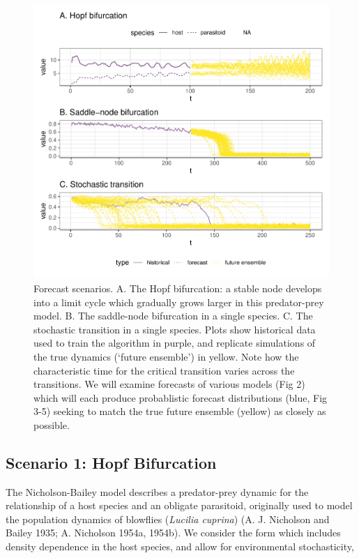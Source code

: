 \documentclass{article}
\begin{document}
\begin{figure}
\centering
\includegraphics{manuscript_files/figure-latex/figure1-1.pdf}
\caption{Forecast scenarios. A. The Hopf bifurcation: a stable node
develops into a limit cycle which gradually grows larger in this
predator-prey model. B. The saddle-node bifurcation in a single species.
C. The stochastic transition in a single species. Plots show historical
data used to train the algorithm in purple, and replicate simulations of
the true dynamics (`future ensemble') in yellow. Note how the
characteristic time for the critical transition varies across the
transitions. We will examine forecasts of various models (Fig 2) which
will each produce probablistic forecast distributions (blue, Fig 3-5)
seeking to match the true future ensemble (yellow) as closely as
possible.}
\end{figure}

\hypertarget{scenario-1-hopf-bifurcation}{%
\subsection{Scenario 1: Hopf
Bifurcation}\label{scenario-1-hopf-bifurcation}}

The Nicholson-Bailey model describes a predator-prey dynamic for the
relationship of a host species and an obligate parasitoid, originally
used to model the population dynamics of blowflies (\emph{Lucilia
cuprina}) (A. J. Nicholson and Bailey 1935; A. Nicholson 1954a, 1954b).
We consider the form which includes density dependence in the host
species, and allow for environmental stochasticity,
\end{document}
